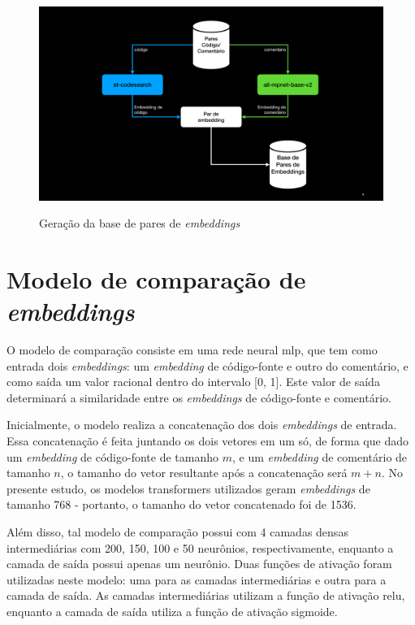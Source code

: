 \begin{figure}[H]
    \centering
        \caption{Geração da base de pares de \textit{embeddings}}
        \includegraphics[scale=0.35]{db_embeddings.pdf}
        \label{fig:metodology-db-embeddings}
\end{figure}

\section{Modelo de comparação de \textit{embeddings}}
\label{sec:methodology:embedding-comparator}

O modelo de comparação consiste em uma rede neural \gls{mlp}, que tem como entrada dois \textit{embeddings}: um \textit{embedding} de código-fonte e outro do comentário, e como saída um valor racional dentro do intervalo [0, 1]. Este valor de saída determinará a similaridade entre os \textit{embeddings} de código-fonte e comentário.

Inicialmente, o modelo realiza a concatenação dos dois \textit{embeddings} de entrada. Essa concatenação é feita juntando os dois vetores em um só, de forma que dado um \textit{embedding} de código-fonte de tamanho $m$, e um \textit{embedding} de comentário de tamanho $n$, o tamanho do vetor resultante após a concatenação será $m + n$. No presente estudo, os modelos transformers utilizados geram \textit{embeddings} de tamanho 768 - portanto, o tamanho do vetor concatenado foi de 1536.

Além disso, tal modelo de comparação possui com 4 camadas densas intermediárias com 200, 150, 100 e 50 neurônios, respectivamente, enquanto a camada de saída possui apenas um neurônio. Duas funções de ativação foram utilizadas neste modelo: uma para as camadas intermediárias e outra para a camada de saída. As camadas intermediárias utilizam a função de ativação \gls{relu}, enquanto a camada de saída utiliza a função de ativação sigmoide.

